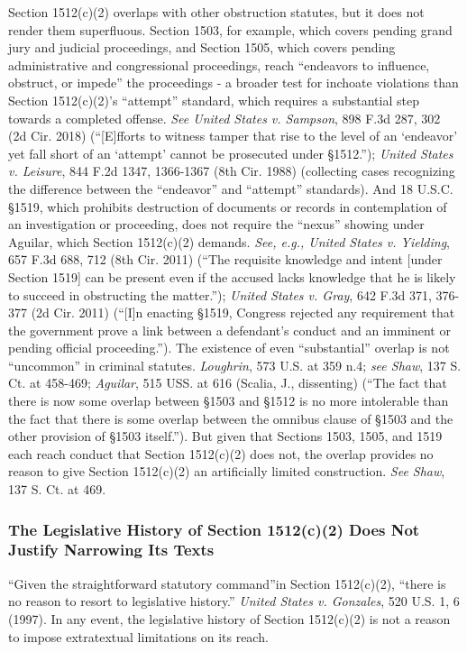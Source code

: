 Section 1512(c)(2) overlaps with other obstruction statutes, but it does not render them superfluous.
Section 1503, for example, which covers pending grand jury and judicial proceedings, and Section 1505, which covers pending administrative and congressional proceedings, reach “endeavors to influence, obstruct, or impede” the proceedings - a broader test for inchoate violations than Section 1512(c)(2)’s “attempt” standard, which requires a substantial step towards a completed offense.
\textit{See United States v. Sampson}, 898 F.3d 287, 302 (2d Cir. 2018) (“[E]fforts to witness tamper that rise to the level of an ‘endeavor’ yet fall short of an ‘attempt’ cannot be prosecuted under \S 1512.”);
\textit{United States v. Leisure}, 844 F.2d 1347, 1366-1367 (8th Cir. 1988) (collecting cases recognizing the difference between the “endeavor” and “attempt” standards).
And 18 U.S.C. \S 1519, which prohibits destruction of documents or records in contemplation of an investigation or proceeding, does not require the “nexus” showing under Aguilar, which Section 1512(c)(2) demands.
\textit{See, e.g., United States v. Yielding}, 657 F.3d 688, 712 (8th Cir. 2011) (“The requisite knowledge and intent [under Section 1519] can be present even if the accused lacks knowledge that he is likely to succeed in obstructing the matter.”);
\textit{United States v. Gray}, 642 F.3d 371, 376-377 (2d Cir. 2011) (“[I]n enacting \S 1519, Congress rejected any requirement that the government prove a link between a defendant’s conduct and an imminent or pending official proceeding.”).
The existence of even “substantial” overlap is not “uncommon” in criminal statutes.
\textit{Loughrin}, 573 U.S. at 359 n.4;
\textit{see Shaw}, 137 S. Ct. at 458-469;
\textit{Aguilar}, 515 USS. at 616 (Scalia, J., dissenting) (“The fact that there is now some overlap between \S 1503 and \S 1512 is no more intolerable than the fact that there is some overlap between the omnibus clause of \S 1503 and the other provision of \S 1503 itself.”).
But given that Sections 1503, 1505, and 1519 each reach conduct that Section 1512(c)(2) does not, the overlap provides no reason to give Section 1512(c)(2) an artificially limited construction.
\textit{See Shaw}, 137 S. Ct. at 469.%

\subsubsection{The Legislative History of Section 1512(c)(2) Does Not Justify Narrowing Its Texts}

“Given the straightforward statutory command”in Section 1512(c)(2), “there is no reason to resort to legislative history.”
\textit{United States v. Gonzales}, 520 U.S. 1, 6 (1997).
In any event, the legislative history of Section 1512(c)(2) is not a reason to impose extratextual limitations on its reach.

